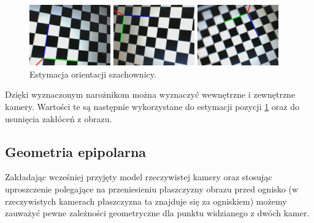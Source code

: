 \documentclass[oneside, eng]{mgr}
\begin{document}
\begin{figure}
\centering
		\begin{minipage}{3.5cm}
			\includegraphics[width=3.5cm]{left8.jpg}
		\end{minipage}
		\begin{minipage}{3.5cm}
			\includegraphics[width=3.5cm]{left17.jpg}
		\end{minipage}
		\begin{minipage}{3.5cm}
			\includegraphics[width=3.5cm]{left24.jpg}
		\end{minipage}
	\caption{Estymacja orientacji szachownicy. }
	\label{fig:pose}
\end{figure}

Dzięki wyznaczonym narożnikom można wyznaczyć wewnętrzne i zewnętrzne kamery. Wartości te są następnie wykorzystane do estymacji pozycji \ref{fig:pose} oraz do usunięcia zakłóceń z obrazu. 

\subsection{Geometria epipolarna}

Zakładając wcześniej przyjęty model rzeczywistej kamery oraz stosując uproszczenie polegające na przeniesieniu płaszczyzny obrazu przed ognisko (w rzeczywistych kamerach płaszczyzna ta znajduje się za ogniskiem) możemy zauważyć pewne zależności geometryczne dla punktu widzianego z dwóch kamer. 
\end{document}
